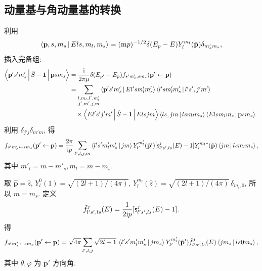 \subsection{动量基与角动量基的转换}

利用
\[
\left\langle \mathbf{p},s,m_s \,\middle|\, Els,m_l,m_s \right\rangle=(\mathrm{m}p)^{-1/2}\delta(E_p-E)Y_l^{m_l}(\hat{\mathbf{p}})\delta_{m'_s m_s},
\]
插入完备组:
\begin{align}
\left\langle \mathbf{p}'s'm'_s \,\middle|\, \hat{S}-\mathbf{1} \,\middle|\, \mathbf{p}sm_s \right\rangle&=\frac{\mathrm{i}}{2\pi \mu}\delta(E_{p'}-E_p)f_{s'm'_s,sm_s}(\mathbf{p}'\leftarrow \mathbf{p})\nonumber\\
&=\sum_{\substack{l,m_l,l',m'_l\\ j',m',j,m}}\left\langle \mathbf{p}'s'm'_s \,\middle|\, El'sm'_l m'_s \right\rangle\left\langle l'sm'_lm'_s \,\middle|\, l's',j'm' \right\rangle\nonumber\\
&\quad\times \left\langle El's'j'm' \,\middle|\, \hat{S}-\mathbf{1} \,\middle|\, Elsjm \right\rangle\left\langle ls,jm \,\middle|\, lsm_lm_s \right\rangle\left\langle Elsm_lm_s \,\middle|\, \mathbf{p}sm_s \right\rangle.
\end{align}
利用 $\delta_{j'j}\delta_{m'm}$, 得
\begin{equation}
f_{s'm'_s\leftarrow sm_s}(\mathbf{p}'\leftarrow \mathbf{p})=\frac{2\pi}{\mathrm{i} p}\sum_{l',l,j,m}\left\langle l's'm'_lm'_s \,\middle|\, jm \right\rangle Y_{l'}^{m'_l}(\hat{\mathbf{p}}')[\mathsf{s}^j_{l's',ls}(E)-1]Y_l^{m_l*}(\hat{\mathbf{p}})\left\langle jm \,\middle|\, lsm_lm_s \right\rangle,
\end{equation}
其中 $m'_l=m-m'_s, m_l=m-m_s$.

取 $\hat{\mathbf{p}}=\hat{z}$, $Y_l^0(1)=\sqrt{(2l+1)/(4\pi)}$, $Y_l^{m_l}(\hat{z})=\sqrt{(2l+1)/(4\pi)}\,\delta_{m_l,0}$, 所以 $m=m_s$. 定义
\[
\tilde{f}^j_{l's',ls}(E)=\frac{1}{2\mathrm{i} p}[\mathsf{s}^j_{l's',ls}(E)-1].
\]
得
\begin{equation}\label{eq:fpwspin}
f_{s'm'_s\leftarrow sm_s}(\mathbf{p}'\leftarrow \mathbf{p})=\sqrt{4\pi}\sum_{l',l,j}\sqrt{2l+1}\,\left\langle l's'm'_lm'_s \,\middle|\, jm_s \right\rangle Y_{l'}^{m'_l}(\hat{\mathbf{p}}')\tilde{f}^j_{l's',ls}(E)\left\langle jm_s \,\middle|\, ls0m_s \right\rangle,
\end{equation}
其中 $\theta,\varphi$ 为 $\mathbf{p}'$ 方向角.

